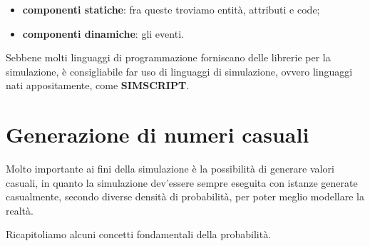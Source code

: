 \documentclass[11pt, oneside]{book}
\begin{document}
\begin{itemize}
\item {\bf componenti statiche}: fra queste troviamo entit\`a,
  attributi e code;

\item {\bf componenti dinamiche}: gli eventi.
\end{itemize}

\par\bigskip

Sebbene molti linguaggi di programmazione forniscano delle librerie
per la simulazione, \`e consigliabile far uso di linguaggi di
simulazione, ovvero linguaggi nati appositamente, come {\bf
  SIMSCRIPT}.

\section{Generazione di numeri casuali}

Molto importante ai fini della simulazione \`e la possibilit\`a di
generare valori casuali, in quanto la simulazione dev'essere sempre
eseguita con istanze generate casualmente, secondo diverse densit\`a
di probabilit\`a, per poter meglio modellare la realt\`a.

\par\bigskip

Ricapitoliamo alcuni concetti fondamentali della probabilit\`a.
\end{document}
